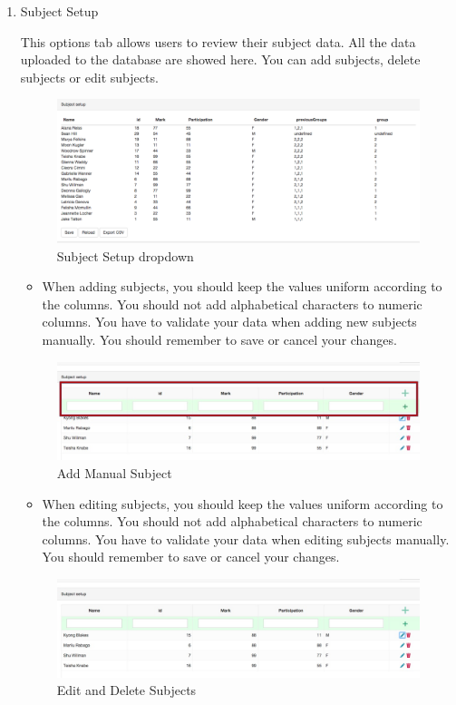 \begin{enumerate}
\newpage
\item Subject Setup\par
This options tab allows users to review their subject data. All the data uploaded to the database are showed here. You can add subjects, delete subjects or edit subjects.\par
 \begin{figure}[H] 
	\centering
	\includegraphics[width=13cm]{./graphics/SubjectSetup.jpg}\par
	\caption{Subject Setup dropdown}
\end{figure}
\begin{itemize}
\item When adding subjects, you should keep the values uniform according to the columns. You should not add alphabetical characters to numeric columns. You have to validate your data when adding new subjects manually. You should remember to save or cancel your changes.
\end{itemize}
\begin{figure}[H] 
	\centering
	\includegraphics[width=13cm]{./graphics/AddManualSubject.jpg}\par
	\caption{Add Manual Subject}
\end{figure}
\begin{itemize}
\item When editing subjects, you should keep the values uniform according to the columns. You should not add alphabetical characters to numeric columns. You have to validate your data when editing subjects manually. You should remember to save or cancel your changes.
\end{itemize}
 \begin{figure}[H] 
	\centering
	\includegraphics[width=13cm]{./graphics/EditAndDeleteSubject.jpg}\par
	\caption{Edit and Delete Subjects}
\end{figure}


\end{enumerate}

